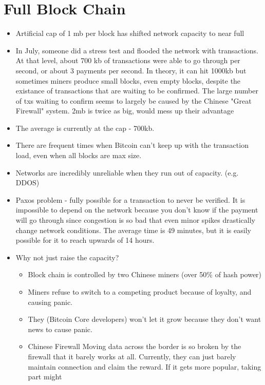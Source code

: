\documentclass{article}
\begin{document}
\section*{Full Block Chain}
\begin{itemize}
  \item Artificial cap of 1 mb per block has shifted network capacity to near full
  \item In July, someone did a stress test and flooded the network with transactions. At that level, about 700 kb of transactions
    were able to go through per second, or about 3 payments per second.
    \subitem In theory, it can hit 1000kb but sometimes miners produce small blocks, even empty blocks, despite the existance of transactions
    that are waiting to be confirmed.
    \subitem The large number of txs waiting to confirm seems to largely be caused by the Chinese "Great Firewall" system.
    \subitem 2mb is twice as big, would mess up their advantage
  \item The average is currently at the cap - 700kb. 
  \item There are frequent times when Bitcoin can't keep up with the transaction load, even when all blocks are max size.
  \item Networks are incredibly unreliable when they run out of capacity. (e.g. DDOS)
  \item Paxos problem - fully possible for a transaction to never be verified. It is impossible to depend on the network because
    you don't know if the payment will go through since congestion is so bad that even minor spikes drastically change network conditions.
    \subitem The average time is 49 minutes, but it is easily possible for it to reach upwards of 14 hours. 
  \item Why not just raise the capacity? 
    \begin{itemize}
      \item Block chain is controlled by two Chinese miners (over 50\% of hash power)
      \item Miners refuse to switch to a competing product because of loyalty, and causing panic.
      \item They (Bitcoin Core developers) won't let it grow because they don't want news to cause panic. 
      \item Chinese Firewall
        \subitem Moving data across the border is so broken by the firewall that it barely works at all.
        \subitem Currently, they can just barely maintain connection and claim the reward. If it gets more popular, taking part might

\end{itemize}
\end{itemize}
\end{document}

